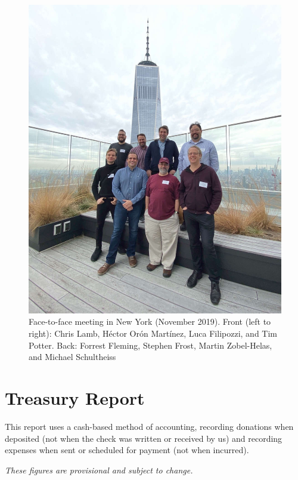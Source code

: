 \documentclass[a4paper]{report}
\begin{document}
\begin{figure}[h]
\centering

\includegraphics[scale=1.25]{images/2019-november-f2f}

\caption{Face-to-face meeting in New York (November 2019). Front (left
to right): Chris Lamb, Héctor Orón Martínez, Luca Filipozzi, and Tim
Potter.  Back: Forrest Fleming, Stephen Frost, Martin Zobel-Helas,
and Michael Schultheiss}

\end{figure}

\chapter{Treasury Report}

This report uses a cash-based method of accounting, recording donations
when deposited (not when the check was written or received by us) and
recording expenses when sent or scheduled for payment (not when
incurred).

{\em These figures are provisional and subject to change.}
\end{document}
